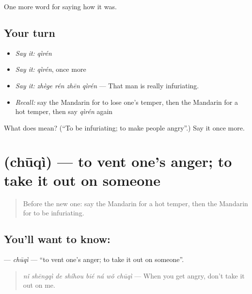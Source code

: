 \begin{grammarlens}[title={What you've built}]
One more word for saying how it was.
\end{grammarlens}

\subsection*{Your turn}
\begin{itemize}
\raggedright
  \item \emph{Say it:} \emph{qìrén}
  \item \emph{Say it:} \emph{qìrén}, once more
  \item \emph{Say it:} \emph{zhège rén zhēn qìrén} — That man is really infuriating.
  \item \emph{Recall:} say the Mandarin for to lose one's temper, then the Mandarin for a hot temper, then say \emph{qìrén} again
\end{itemize}

\begin{tcolorbox}[breakable,colback=teal!4,colframe=teal!35!black,title={Before you move on}]
What does  mean? (\textquotedblleft{}To be infuriating; to make people angry\textquotedblright{}.) Say it once more.
\end{tcolorbox}
\section[\texorpdfstring{\zh{出气} (chūqì)}{出气 (chūqì)}]{ (chūqì) — to vent one's anger; to take it out on someone}

\label{lesson:ZH-C464-chuqi}



\begin{quote}
Before the new one: say the Mandarin for a hot temper, then the Mandarin for to be infuriating.
\end{quote}

\subsection*{You'll want to know: }
\textbf{} — \emph{chūqì} — \textquotedblleft{}to vent one's anger; to take it out on someone\textquotedblright{}.

\begin{quote}
\emph{nǐ shēngqì de shíhou bié ná wǒ chūqì} — When you get angry, don't take it out on me.
\end{quote}

